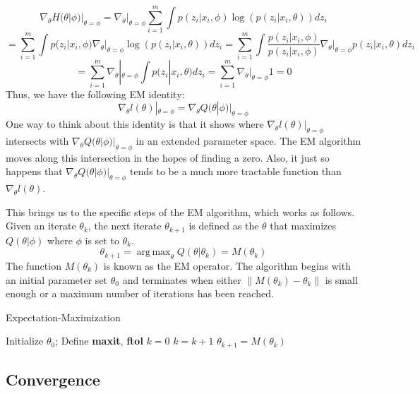 \documentclass[letter,12pt]{article}
\DeclareMathOperator*{\argmax}{arg\,max}
\begin{document}
\[
\nabla_{\theta}H(\theta|\phi)|_{\theta = \phi}
=
\nabla_{\theta}|_{\theta = \phi}\sum_{i=1}^{m} \int p(z_i|x_i,\phi) \log \left(p(z_i|x_i,\theta)\right) dz_i
\]
\[
=
\sum_{i=1}^{m} 
\int p(z_i|x_i,\phi) 
\nabla_{\theta}|_{\theta = \phi}
\log \left(p(z_i|x_i,\theta)\right) dz_i
=
\sum_{i=1}^{m} 
\int \dfrac{p(z_i|x_i,\phi)}{p(z_i|x_i,\phi)} 
\nabla_{\theta}|_{\theta = \phi}
p(z_i|x_i,\theta) dz_i
\]
\[
=
\sum_{i=1}^{m} 
\nabla_{\theta}|_{\theta = \phi}
\int 
p(z_i|x_i,\theta) dz_i
=
\sum_{i=1}^{m} 
\nabla_{\theta}|_{\theta = \phi}
1
=0
\]
Thus, we have the following EM identity:
\begin{equation} \label{eq:dl_is_dq}
\nabla_{\theta}l(\theta)|_{\theta = \phi}
=
\nabla_{\theta}Q(\theta|\phi)|_{\theta = \phi}
\end{equation}
One way to think about this identity is that it shows where $\nabla_{\theta}l(\theta)|_{\theta = \phi}$ intersects with  $\nabla_{\theta}Q(\theta|\phi)|_{\theta = \phi}$ in an extended parameter space.  The EM algorithm moves along this intersection in the hopes of finding a zero.  Also, it just so happens that $\nabla_{\theta}Q(\theta|\phi)|_{\theta = \phi}$ tends to be a much more tractable function than $\nabla_{\theta}l(\theta)$.  

This brings us to the specific steps of the EM algorithm, which works as follows.  Given an iterate $\theta_k$, the next iterate $\theta_{k+1}$ is defined as the $\theta$ that maximizes $Q(\theta|\phi)$ where $\phi$ is set to $\theta_k$.
\[
\theta_{k+1} = \argmax_{\theta}  Q(\theta|\theta_k) = M(\theta_k)
\]
The function $M(\theta_k)$ is known as the EM operator.  The algorithm begins with an initial parameter set $\theta_0$ and terminates when either $\|M(\theta_k)-\theta_k\|$ is small enough or a maximum number of iterations has been reached.


\begin{algorithm}
\caption{Expectation-Maximization}
\label{alg:em}
\begin{algorithmic}[1]
\State Initialize $\theta_0$; Define \textbf{maxit}, \textbf{ftol}
\State $k = 0$
\State $k = k+1$
\State $\theta_{k+1} = M(\theta_k)$
\EndWhile
\end{algorithmic}
\end{algorithm}

\subsection{Convergence} \label{section:convergence}
\end{document}
